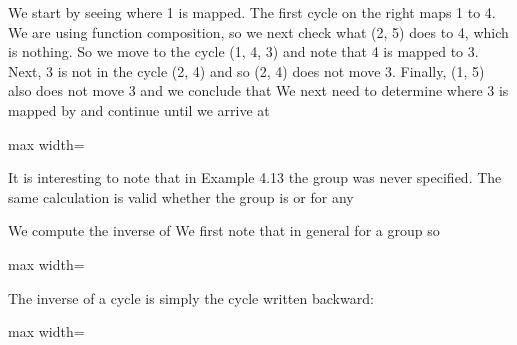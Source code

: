 \documentclass[11pt,oneside]{article}
\begin{document}
\begin{BookBody}

We start by seeing where 1 is mapped. The first cycle on the right maps 1 to 4. We are using function composition, so we next check what (2, 5) does to 4, which is nothing. So we move to the cycle (1, 4, 3) and note that 4 is mapped to 3. Next, 3 is not in the cycle (2, 4) and so (2, 4) does not move 3. Finally, (1, 5) also does not move 3 and we conclude that  We next need to determine where 3 is mapped by \BookInline{\sigma } and continue until we arrive at

\begin{center}\begin{adjustbox}{max width=\linewidth}\end{adjustbox}\end{center} \BookEnd{\blacktriangle}

\noindent It is interesting to note that in Example 4.13 the group was never specified. The same calculation is valid whether the group is  or  for any 

 We compute the inverse of  We first note that in general for a group  so

\begin{center}\begin{adjustbox}{max width=\linewidth}\end{adjustbox}\end{center}

\noindent The inverse of a cycle is simply the cycle written backward:

\begin{center}\begin{adjustbox}{max width=\linewidth}\end{adjustbox}\end{center}


\end{BookBody}
\end{document}
